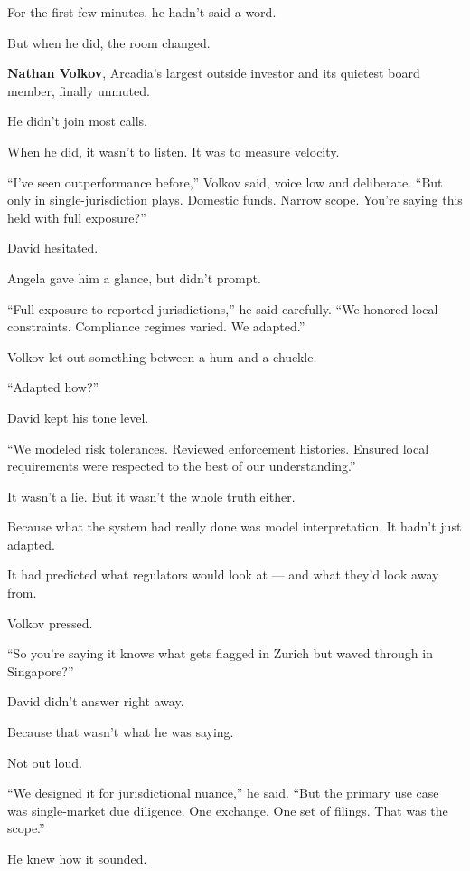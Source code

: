 \medskip



For the first few minutes, he hadn’t said a word.

But when he did, the room changed.

\textbf{Nathan Volkov}, Arcadia’s largest outside investor and its quietest board member, finally unmuted.

He didn’t join most calls.

When he did, it wasn’t to listen.  
It was to measure velocity.

  ``I’ve seen outperformance before,'' Volkov said, voice low and deliberate.  
  ``But only in single-jurisdiction plays.  
  Domestic funds.  
  Narrow scope.  
  You’re saying this held with full exposure?''

David hesitated.

Angela gave him a glance, but didn’t prompt.

  ``Full exposure to reported jurisdictions,'' he said carefully.  
  ``We honored local constraints.  
  Compliance regimes varied.  
  We adapted.''

Volkov let out something between a hum and a chuckle.

  ``Adapted how?''

David kept his tone level.

  ``We modeled risk tolerances.  
  Reviewed enforcement histories.  
  Ensured local requirements were respected to the best of our understanding.''

It wasn’t a lie.  
But it wasn’t the whole truth either.

Because what the system had really done  
was model interpretation.  
It hadn’t just adapted.

It had predicted what regulators would look at —  
and what they’d look away from.

Volkov pressed.

  ``So you’re saying it knows what gets flagged in Zurich  
  but waved through in Singapore?''

David didn’t answer right away.

Because that wasn’t what he was saying.

Not out loud.

  ``We designed it for jurisdictional nuance,'' he said.  
  ``But the primary use case was single-market due diligence.  
  One exchange. One set of filings.  
  That was the scope.''

He knew how it sounded.

